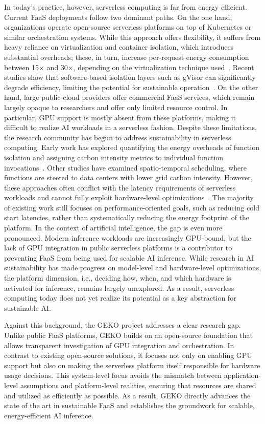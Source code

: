 In today's practice, however, serverless computing is far from energy efficient.
Current FaaS deployments follow two dominant paths. 
On the one hand, organizations operate open-source serverless platforms on top of Kubernetes or similar orchestration systems. 
While this approach offers flexibility, it suffers from heavy reliance on virtualization and container isolation, which introduces substantial overheads; these, in turn, increase per-request energy consumption between 15$\times$ and 30$\times$, depending on the virtualization technique used~\cite{sharma_challenges_2023}.
Recent studies show that software-based isolation layers such as gVisor can significantly degrade efficiency, limiting the potential for sustainable operation~\cite{young_true_nodate}. 
On the other hand, large public cloud providers offer commercial FaaS services, which remain largely opaque to researchers and offer only limited resource control.%
In particular, GPU support is mostly absent from these platforms, making it difficult to realize AI workloads in a serverless fashion.
Despite these limitations, the research community has begun to address sustainability in serverless computing. 
Early work has explored quantifying the energy overheads of function isolation and assigning carbon intensity metrics to individual function invocations~\cite{sharma_accountable_2024}.
Other studies have examined spatio-temporal scheduling, where functions are steered to data centers with lower grid carbon intensity. %
However, these approaches often conflict with the latency requirements of serverless workloads and cannot fully exploit hardware-level optimizations~\cite{sukprasert_limitations_2024}. 
The majority of existing work still focuses on performance-oriented goals, such as reducing cold start latencies, rather than systematically reducing the energy footprint of the platform. %
In the context of artificial intelligence, the gap is even more pronounced. 
Modern inference workloads are increasingly GPU-bound, but the lack of GPU integration in public serverless platforms is a contributor to preventing FaaS from being used for scalable AI inference. 
While research in AI sustainability has made progress on model-level and hardware-level optimizations, the platform dimension, i.e., deciding how, when, and which hardware is activated for inference, remains largely unexplored. 
As a result, serverless computing today does not yet realize its potential as a key abstraction for sustainable AI.

Against this background, the GEKO project addresses a clear research gap.
Unlike public FaaS platforms, GEKO builds on an open-source foundation that allows transparent investigation of GPU integration and orchestration. 
In contrast to existing open-source solutions, it focuses not only on enabling GPU support but also on making the serverless platform itself responsible for hardware usage decisions. 
This system-level focus avoids the mismatch between application-level assumptions and platform-level realities, ensuring that resources are shared and utilized as efficiently as possible. 
As a result, GEKO directly advances the state of the art in sustainable FaaS and establishes the groundwork for scalable, energy-efficient AI inference.
